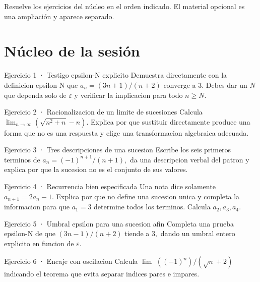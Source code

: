 \documentclass[10pt,a4paper,oneside,openany]{book}
\begin{document}
Resuelve los ejercicios del núcleo en el orden indicado. El material opcional es una ampliación y aparece separado.
\section*{Núcleo de la sesión}
\begin{PSevenExerciseFixed}{Ejercicio 1 · Testigo epsilon-N explicito}
Demuestra directamente con la definicion epsilon-N que \(a_n=(3n+1)/(n+2)\) converge a \(3\). Debes dar un \(N\) que dependa solo de \(\varepsilon \) y verificar la implicacion para todo \(n\ge N\).
\end{PSevenExerciseFixed}
\begin{PSevenExerciseFixed}{Ejercicio 2 · Racionalizacion de un limite de sucesiones}
Calcula \(\lim_{n\to \infty }(\sqrt{n^{2}+n}-n)\). Explica por que sustituir directamente produce una forma que no es una respuesta y elige una transformacion algebraica adecuada.
\end{PSevenExerciseFixed}
\begin{PSevenExerciseFixed}{Ejercicio 3 · Tres descripciones de una sucesion}
Escribe los seis primeros terminos de \(a_n=(-1)^{n+1}/(n+1),\) da una descripcion verbal del patron y explica por que la sucesion no es el conjunto de sus valores.
\end{PSevenExerciseFixed}
\begin{PSevenExerciseFixed}{Ejercicio 4 · Recurrencia bien especificada}
Una nota dice solamente \(a_{n+1}=2a_n-1\). Explica por que no define una sucesion unica y completa la informacion para que \(a_1=3\) determine todos los terminos. Calcula \(a_2,a_3,a_4\).
\end{PSevenExerciseFixed}
\begin{PSevenExerciseFixed}{Ejercicio 5 · Umbral epsilon para una sucesion afin}
Completa una prueba epsilon-N de que \((3n-1)/(n+2)\) tiende a \(3,\) dando un umbral entero explicito en funcion de \(\varepsilon \).
\end{PSevenExerciseFixed}
\begin{PSevenExerciseFixed}{Ejercicio 6 · Encaje con oscilacion}
Calcula \(\lim\) \(((-1)^n)/(\sqrt{n}+2)\) indicando el teorema que evita separar indices pares e impares.
\end{PSevenExerciseFixed}
\end{document}
